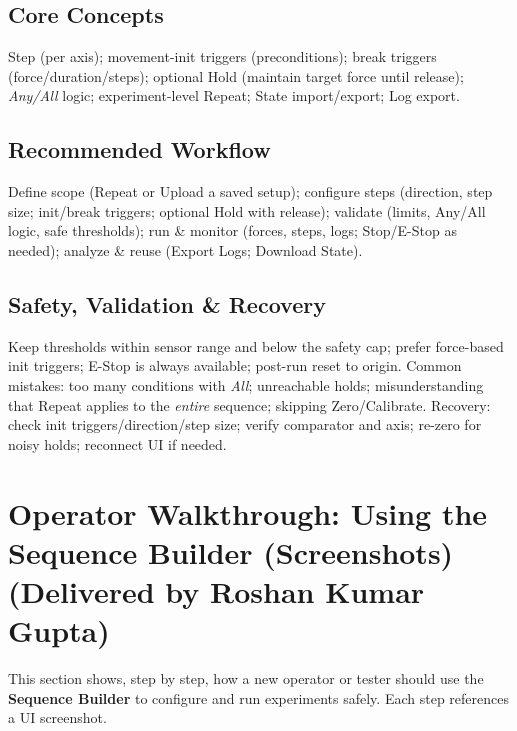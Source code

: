 \documentclass[
    twocolumn,
    fontsize = 10pt,
    parskip = half+,
    headings = small,
    headwidth = text,
    footwidth = text,
]{scrartcl}
\begin{document}
\subsection{Core Concepts}
Step (per axis); movement-init triggers (preconditions); break triggers (force/duration/steps); optional Hold (maintain target force until release); \emph{Any/All} logic; experiment-level Repeat; State import/export; Log export.

\subsection{Recommended Workflow}
Define scope (Repeat or Upload a saved setup); configure steps (direction, step size; init/break triggers; optional Hold with release); validate (limits, Any/All logic, safe thresholds); run \& monitor (forces, steps, logs; Stop/E-Stop as needed); analyze \& reuse (Export Logs; Download State).

\subsection{Safety, Validation \& Recovery}
Keep thresholds within sensor range and below the safety cap; prefer force-based init triggers; E-Stop is always available; post-run reset to origin. Common mistakes: too many conditions with \emph{All}; unreachable holds; misunderstanding that Repeat applies to the \emph{entire} sequence; skipping Zero/Calibrate. Recovery: check init triggers/direction/step size; verify comparator and axis; re-zero for noisy holds; reconnect UI if needed.


\section{Operator Walkthrough: Using the Sequence Builder (Screenshots) \textnormal{(Delivered by Roshan Kumar Gupta)}}
\label{sec:sb-walkthrough}

This section shows, step by step, how a new operator or tester should use the \textbf{Sequence Builder} to configure and run experiments safely. Each step references a UI screenshot.
\end{document}
